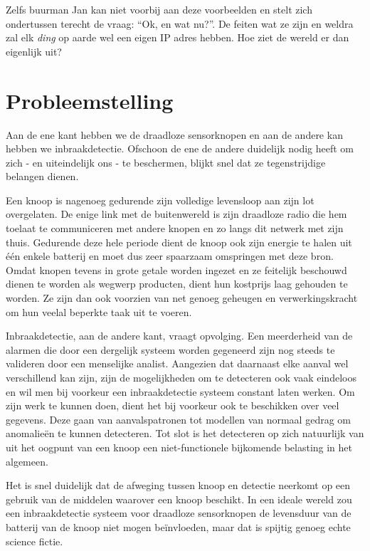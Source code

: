 \documentclass[12pt,a4paper]{article}
\begin{document}
Zelfs buurman Jan kan niet voorbij aan deze voorbeelden en stelt zich
ondertussen terecht de vraag: ``Ok, en wat nu?''. De feiten wat ze zijn en
weldra zal elk \emph{ding} op aarde wel een eigen IP adres hebben. Hoe ziet de
wereld er dan eigenlijk uit?

\section*{Probleemstelling}

Aan de ene kant hebben we de draadloze sensorknopen en aan de andere kan hebben
we inbraakdetectie. Ofschoon de ene de andere duidelijk nodig heeft om zich -
en uiteindelijk ons - te beschermen, blijkt snel dat ze tegenstrijdige belangen
dienen.

Een knoop is nagenoeg gedurende zijn volledige levensloop aan zijn lot
overgelaten. De enige link met de buitenwereld is zijn draadloze radio die hem
toelaat te communiceren met andere knopen en zo langs dit netwerk met zijn
thuis. Gedurende deze hele periode dient de knoop ook zijn energie te halen uit
\'e\'en enkele batterij en moet dus zeer spaarzaam omspringen met deze bron.
Omdat knopen tevens in grote getale worden ingezet en ze feitelijk beschouwd
dienen te worden als wegwerp producten, dient hun kostprijs laag gehouden te
worden. Ze zijn dan ook voorzien van net genoeg geheugen en verwerkingskracht
om hun veelal beperkte taak uit te voeren.

Inbraakdetectie, aan de andere kant, vraagt opvolging. Een meerderheid van de
alarmen die door een dergelijk systeem worden gegeneerd zijn nog steeds te
valideren door een menselijke analist. Aangezien dat daarnaast elke aanval wel
verschillend kan zijn, zijn de mogelijkheden om te detecteren ook vaak
eindeloos en wil men bij voorkeur een inbraakdetectie systeem constant laten
werken. Om zijn werk te kunnen doen, dient het bij voorkeur ook te beschikken
over veel gegevens. Deze gaan van aanvalspatronen tot modellen van normaal
gedrag om anomalie\"en te kunnen detecteren. Tot slot is het detecteren op zich
natuurlijk van uit het oogpunt van een knoop een niet-functionele bijkomende
belasting in het algemeen.

Het is snel duidelijk dat de afweging tussen knoop en detectie neerkomt op een
gebruik van de middelen waarover een knoop beschikt. In een ideale wereld zou
een inbraakdetectie systeem voor draadloze sensorknopen de levensduur van de
batterij van de knoop niet mogen be\"invloeden, maar dat is spijtig genoeg
echte science fictie.
\end{document}
